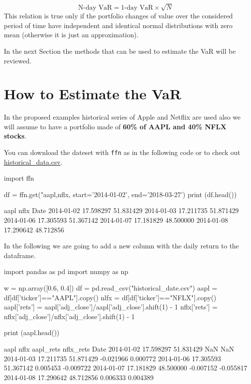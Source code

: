 \begin{equation}
\textrm{N-day VaR} = \textrm{1-day VaR}\times \sqrt{N}
\label{eq:var_horizon}
\end{equation}
This relation is true only if the portfolio changes of value over
the considered period of time have independent and identical normal
distributions with zero mean (otherwise it is just an approximation).

In the next Section the methods that can be used to estimate the VaR
will be reviewed.

\section{How to Estimate the VaR}
\label{how-to-estimate-the-var}

In the proposed examples historical series of Apple and Netflix
are used also we will assume to have a portfolio made of 
\textbf{60\% of AAPL and 40\% NFLX stocks}.
 
You can download the dateset with \texttt{ffn} as in the following code or to
check out \href{https://raw.githubusercontent.com/matteosan1/finance_course/develop/libro/input_files/historical_data.csv}{historical\_data.csv}.

\begin{ipython}
import ffn
	
df = ffn.get("aapl,nflx, start='2014-01-02', end='2018-03-27')
print (df.head())
\end{ipython}
\begin{ioutput}
                 aapl       nflx
Date
2014-01-02  17.598297  51.831429
2014-01-03  17.211735  51.871429
2014-01-06  17.305593  51.367142
2014-01-07  17.181829  48.500000
2014-01-08  17.290642  48.712856
\end{ioutput}
\noindent
In the following we are going to add a new column with the daily return to the dataframe.

\begin{ipython}
import pandas as pd
import numpy as np

w = np.array([0.6, 0.4])
df = pd.read_csv("historical_date.csv")
aapl = df[df['ticker']=="AAPL"].copy()
nlfx = df[df['ticker']=="NFLX"].copy()
aapl['rets'] = aapl['adj_close']/aapl['adj_close'].shift(1) - 1
nflx['rets'] = nflx['adj_close']/nflx['adj_close'].shift(1) - 1

print (aapl.head())
\end{ipython}
\begin{ioutput}
                 aapl       nflx  aapl_rets  nflx_rets
Date
2014-01-02  17.598297  51.831429        NaN        NaN
2014-01-03  17.211735  51.871429  -0.021966   0.000772
2014-01-06  17.305593  51.367142   0.005453  -0.009722
2014-01-07  17.181829  48.500000  -0.007152  -0.055817
2014-01-08  17.290642  48.712856   0.006333   0.004389
\end{ioutput}

